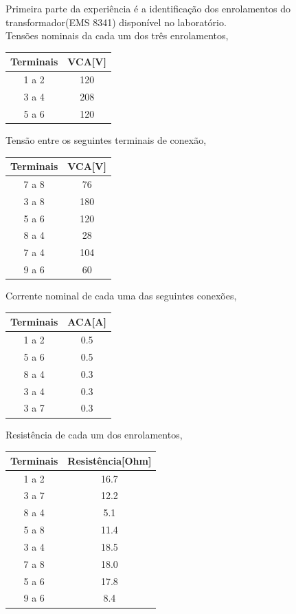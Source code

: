 \documentclass[conference]{IEEEtran}
\begin{document}
Primeira parte da experiência é a identificação dos enrolamentos do
transformador(EMS 8341) disponível no laboratório.\\
Tensões nominais da cada um dos três enrolamentos,
\begin{center}
    \begin{tabular}{|c||c|}
        \hline 
        Terminais & VCA[V] \\
        \hline 
        1 a 2 & 120 \\
        3 a 4 & 208 \\
        5 a 6 & 120 \\
        \hline
    \end{tabular}
\end{center}

Tensão entre os seguintes terminais de conexão,
\begin{center}
    \begin{tabular}{|c||c|}
        \hline 
        Terminais & VCA[V] \\
        \hline 
        7 a 8 & 76 \\
        3 a 8 & 180 \\
        5 a 6 & 120 \\
        8 a 4 & 28 \\
        7 a 4 & 104 \\
        9 a 6 & 60 \\
        \hline
    \end{tabular}
\end{center}

Corrente nominal de cada uma das seguintes conexões,
\begin{center}
    \begin{tabular}{|c||c|}
        \hline 
        Terminais & ACA[A] \\
        \hline 
        1 a 2 & 0.5 \\
        5 a 6 & 0.5 \\
        8 a 4 & 0.3 \\
        3 a 4 & 0.3 \\
        3 a 7 & 0.3 \\
        \hline
    \end{tabular}
\end{center}

Resistência de cada um dos enrolamentos,
\begin{center}
    \begin{tabular}{|c||c|}
        \hline 
        Terminais & Resistência[Ohm] \\
        \hline 
        1 a 2 & 16.7 \\
        3 a 7 & 12.2 \\
        8 a 4 & 5.1 \\
        5 a 8 & 11.4 \\
        3 a 4 & 18.5 \\
        7 a 8 & 18.0 \\
        5 a 6 & 17.8 \\
        9 a 6 & 8.4 \\
        \hline
    \end{tabular}
\end{center}
\end{document}
